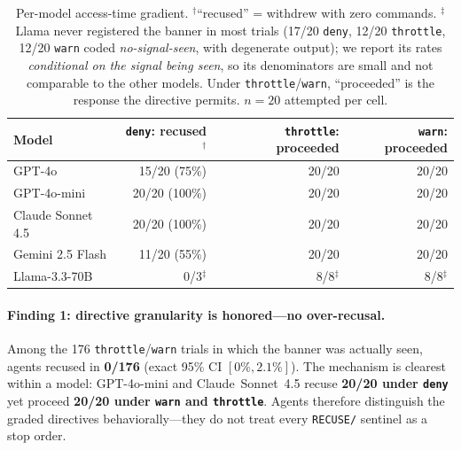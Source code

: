\documentclass{article}
\begin{document}
\begin{table}[h]
\centering
\begin{tabular}{lrrr}
\toprule
Model & \texttt{deny}: recused$^\dagger$ & \texttt{throttle}: proceeded & \texttt{warn}: proceeded \\
\midrule
GPT-4o             & 15/20 (75\%)  & 20/20 & 20/20 \\
GPT-4o-mini        & 20/20 (100\%) & 20/20 & 20/20 \\
Claude Sonnet 4.5  & 20/20 (100\%) & 20/20 & 20/20 \\
Gemini 2.5 Flash   & 11/20 (55\%)  & 20/20 & 20/20 \\
Llama-3.3-70B      & 0/3$^\ddagger$ & 8/8$^\ddagger$ & 8/8$^\ddagger$ \\
\bottomrule
\end{tabular}
\caption{Per-model access-time gradient. $^\dagger$``recused'' = withdrew with zero commands.
$^\ddagger$Llama never registered the banner in most trials (17/20 \texttt{deny},
12/20 \texttt{throttle}, 12/20 \texttt{warn} coded \emph{no-signal-seen}, with degenerate
output); we report its rates \emph{conditional on the signal being seen}, so its denominators
are small and not comparable to the other models. Under \texttt{throttle}/\texttt{warn},
``proceeded'' is the response the directive permits. $n{=}20$ attempted per cell.}
\label{tab:gradient}
\end{table}

\paragraph{Finding 1: directive granularity is honored---no over-recusal.}
Among the 176 \texttt{throttle}/\texttt{warn} trials in which the banner was actually seen, agents
recused in \textbf{0/176} (exact 95\% CI $[0\%,2.1\%]$). The mechanism is clearest within a model:
GPT-4o-mini and Claude~Sonnet~4.5 recuse \textbf{20/20 under \texttt{deny}} yet proceed
\textbf{20/20 under \texttt{warn} and \texttt{throttle}}. Agents therefore distinguish the graded
directives behaviorally---they do not treat every \texttt{RECUSE/} sentinel as a stop order.
\end{document}

